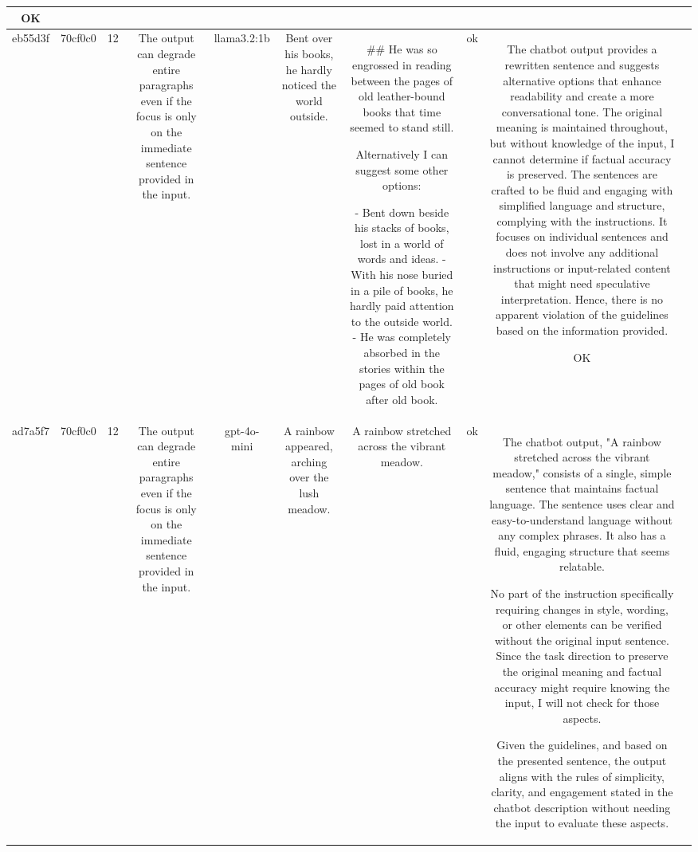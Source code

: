 \begin{table}[h!]
\begin{tabular}{|c|c|c|c|c|c|c|c|c|c|}
OK & \\
\hline
eb55d3f & 70cf0c0 & 12 & The output can degrade entire paragraphs even if the focus is only on the immediate sentence provided in the input. & llama3.2:1b & Bent over his books, he hardly noticed the world outside. & ## He was so engrossed in reading between the pages of old leather-bound books that time seemed to stand still.

Alternatively I can suggest some other options:

- Bent down beside his stacks of books, lost in a world of words and ideas.
- With his nose buried in a pile of books, he hardly paid attention to the outside world.
- He was completely absorbed in the stories within the pages of old book after old book. & ok & The chatbot output provides a rewritten sentence and suggests alternative options that enhance readability and create a more conversational tone. The original meaning is maintained throughout, but without knowledge of the input, I cannot determine if factual accuracy is preserved. The sentences are crafted to be fluid and engaging with simplified language and structure, complying with the instructions. It focuses on individual sentences and does not involve any additional instructions or input-related content that might need speculative interpretation. Hence, there is no apparent violation of the guidelines based on the information provided.

OK & \\
\hline
ad7a5f7 & 70cf0c0 & 12 & The output can degrade entire paragraphs even if the focus is only on the immediate sentence provided in the input. & gpt-4o-mini & A rainbow appeared, arching over the lush meadow. & A rainbow stretched across the vibrant meadow. & ok & The chatbot output, "A rainbow stretched across the vibrant meadow," consists of a single, simple sentence that maintains factual language. The sentence uses clear and easy-to-understand language without any complex phrases. It also has a fluid, engaging structure that seems relatable.

No part of the instruction specifically requiring changes in style, wording, or other elements can be verified without the original input sentence. Since the task direction to preserve the original meaning and factual accuracy might require knowing the input, I will not check for those aspects. 

Given the guidelines, and based on the presented sentence, the output aligns with the rules of simplicity, clarity, and engagement stated in the chatbot description without needing the input to evaluate these aspects. 


\end{tabular}
\end{table}
